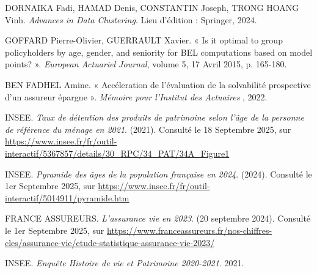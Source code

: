 \newpage %


\begin{thebibliography}{9}



DORNAIKA Fadi, HAMAD Denis, CONSTANTIN Joseph, TRONG HOANG Vinh. \textit{Advances in Data Clustering}. Lieu d'édition : Springer, 2024.

GOFFARD Pierre-Olivier, GUERRAULT Xavier. « Is it optimal to group policyholders by age, gender, and seniority for BEL computations based on model points? ». \textit{European Actuariel Journal}, volume 5, 17 Avril 2015, p. 165-180.


BEN FADHEL Amine. « Accéleration de l'évaluation de la solvabilité prospective d'un assureur épargne ». \textit{Mémoire pour l'Institut des Actuaires }, 2022.

INSEE. \textit{Taux de détention des produits de patrimoine selon l'âge de la personne de référence du ménage en 2021}. (2021). Consulté le 18 Septembre 2025, sur \url{https://www.insee.fr/fr/outil-interactif/5367857/details/30_RPC/34_PAT/34A_Figure1}

INSEE. \textit{Pyramide des âges de la population française en 2024}. (2024). Consulté le 1er Septembre 2025, sur \url{https://www.insee.fr/fr/outil-interactif/5014911/pyramide.htm}

FRANCE ASSUREURS. \textit{L'assurance vie en 2023}. (20 septembre 2024). Consulté le 1er Septembre 2025, sur \url{https://www.franceassureurs.fr/nos-chiffres-cles/assurance-vie/etude-statistique-assurance-vie-2023/}

INSEE. \textit{Enquête Histoire de vie et Patrimoine 2020-2021}. 2021.

\end{thebibliography}